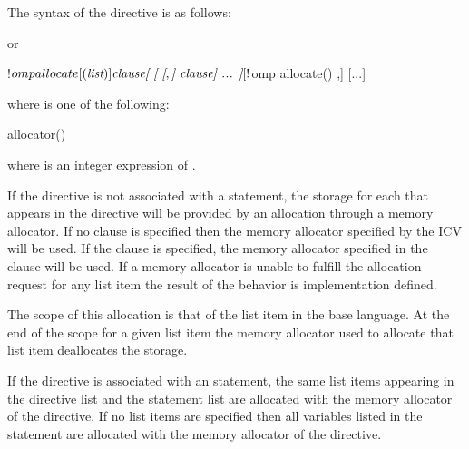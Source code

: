 \begin{fortranspecific}
The syntax of the  directive is as follows:


or
\begin{ompfPragma}
!$omp allocate[()] \plc{clause[ [ [},\plc{] clause] ... ]}
[!$omp allocate() \plc{clause[ [ [},\plc{] clause] ... ]}]
[...]
\end{ompfPragma}

where  is one of the following:

\begin{indentedcodelist}
allocator()
\end{indentedcodelist}

where  is an integer expression of  .

\end{fortranspecific}

\descr

If the directive is not associated with a statement, the storage for each  that appears in the directive will be provided by an allocation through a memory allocator. If no clause is specified then the memory allocator specified by the  ICV will be used. If the  clause is specified, the memory allocator specified in the clause will be used. If a memory allocator is unable to fulfill the allocation request for any list item the result of the behavior is implementation defined.

The scope of this allocation is that of the list item in the base language. At the end of the scope for a given list item the memory allocator used to allocate that list item deallocates the storage.

\begin{fortranspecific}
If the directive is associated with an  statement, the same list items appearing in the directive list and the  statement list are allocated with the memory allocator of the directive.
If no list items are specified then all variables listed in the  statement are allocated with the memory allocator of the directive.
\end{fortranspecific}

